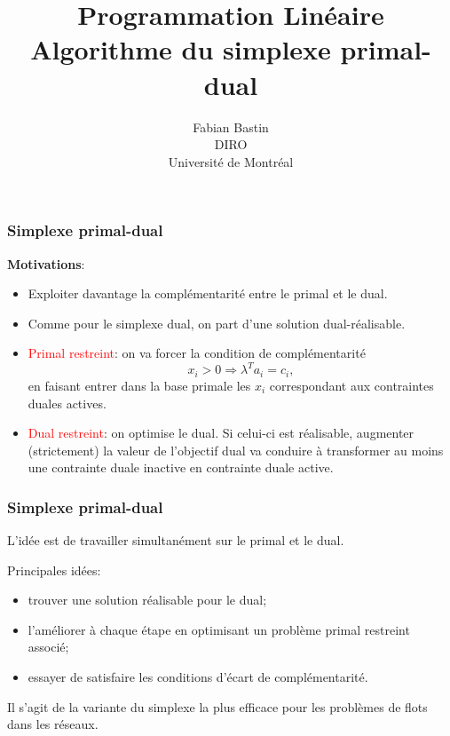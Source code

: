 \documentclass[t,usepdftitle=false]{beamer}
\title[Simplexe primal-dual]{Programmation Linéaire\\Algorithme du simplexe primal-dual}
\author[Fabian Bastin]{Fabian Bastin\\DIRO\\Université de Montréal}
\date{}
\begin{document}
\frame{\titlepage}

\begin{frame}
\frametitle{Simplexe primal-dual}

{\bf Motivations}:
\begin{itemize}
\item
Exploiter davantage la complémentarité entre le primal et le dual.
\item
Comme pour le simplexe dual, on part d'une solution dual-réalisable.
\item
\textcolor{red}{Primal restreint}: on va forcer la condition de complémentarité
\[
x_i > 0 \Rightarrow \lambda^T a_i = c_i,
\]
en faisant entrer dans la base primale les $x_i$ correspondant aux contraintes duales actives.
\item
\textcolor{red}{Dual restreint}: on optimise le dual. Si celui-ci est réalisable, augmenter (strictement) la valeur de l'objectif dual va conduire à transformer au moins une contrainte duale inactive en contrainte duale active.
\end{itemize}

\end{frame}

\begin{frame}
\frametitle{Simplexe primal-dual}

L'idée est de travailler simultanément sur le primal et le dual.

\mbox{}

Principales idées:
\begin{itemize}
\item
trouver une solution réalisable pour le dual;
\item
l'améliorer à chaque étape en optimisant un problème primal restreint associé;
\item
essayer de satisfaire les conditions d'écart de complémentarité.
\end{itemize}

\mbox{}

Il s'agit de la variante du simplexe la plus efficace pour les problèmes de flots dans les réseaux.

\end{frame}
\end{document}
